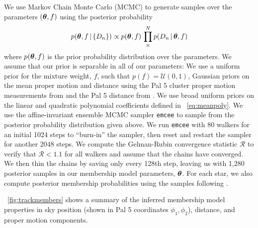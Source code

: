 \documentclass[twocolumn]{aastex63}
\begin{document}
We use Markov Chain Monte Carlo (MCMC) to generate samples over the parameters $(\boldsymbol{\theta}, f)$ using the posterior probability
\begin{equation}
    p(\bs{\theta}, f \given \{D_n\}) \propto p(\bs{\theta}, f) \, \prod_n^N p(D_n \given \bs{\theta}, f)
\end{equation}
where $p(\boldsymbol{\theta}, f)$ is the prior probability distribution over the parameters.
We assume that our prior is separable in all of our parameters: We use a uniform prior for the mixture weight, $f$, such that $p(f) = \mathcal{U}(0, 1)$, Gaussian priors on the mean proper motion and distance using the Pal 5 cluster proper motion measurements from \citet{Vasiliev:2019} and the Pal 5 distance from \citet{Kuepper:2015}.
We use broad uniform priors on the linear and quadratic polynomial coefficients defined in \equationname~\ref{eq:meanpoly}.
We use the affine-invariant ensemble MCMC sampler \texttt{emcee} \citep{emcee} to sample from the posterior probability distribution given above.
We run \texttt{emcee} with 80 walkers for an initial 1024 steps to ``burn-in'' the sampler, then reset and restart the sampler for another 2048 steps.
We compute the Gelman-Rubin convergence statistic $\mathcal{R}$ \citep{Gelman:1992} to verify that $\mathcal{R} < 1.1$ for all walkers and assume that the chains have converged.
We then thin the chains by saving only every 128th step, leaving us with 1,280 posterior samples in our membership model parameters, $\boldsymbol{\theta}$.
For each star, we also compute posterior membership probabilities using the samples following \citet{DFM:blog}.

\figurename~\ref{fig:trackmembers} shows a summary of the inferred membership model properties in sky position (shown in Pal 5 coordinates $\phi_1, \phi_2$), distance, and proper motion components.
\end{document}
